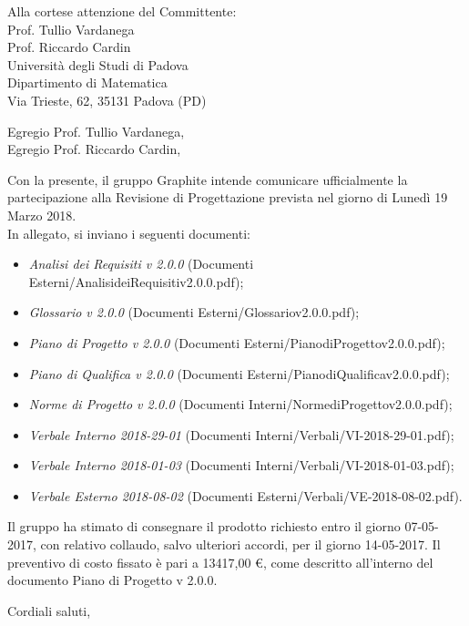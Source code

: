 \documentclass[]{letter}
\begin{document}
\begin{letter}{
		Alla cortese attenzione del Committente: \\
		Prof. Tullio Vardanega \\
		Prof. Riccardo Cardin \\
		Università degli Studi di Padova \\
		Dipartimento di Matematica \\ 
		Via Trieste, 62, 35131 Padova (PD)
	}

\opening{Egregio Prof. Tullio Vardanega, \\ Egregio Prof. Riccardo Cardin,}

\noindent Con la presente, il gruppo Graphite intende comunicare ufficialmente la partecipazione alla Revisione di Progettazione prevista nel giorno di Lunedì 19 Marzo 2018.\\
In allegato, si inviano i seguenti documenti:

\begin{itemize}
	\item \textit{Analisi dei Requisiti v 2.0.0} (Documenti Esterni/AnalisideiRequisitiv2.0.0.pdf);
	\item \textit{Glossario v 2.0.0} (Documenti Esterni/Glossariov2.0.0.pdf);
	\item \textit{Piano di Progetto v 2.0.0} (Documenti Esterni/PianodiProgettov2.0.0.pdf);
	\item \textit{Piano di Qualifica v 2.0.0} (Documenti Esterni/PianodiQualificav2.0.0.pdf);
	\item \textit{Norme di Progetto v 2.0.0} (Documenti Interni/NormediProgettov2.0.0.pdf);
	\item \textit{Verbale Interno 2018-29-01} (Documenti Interni/Verbali/VI-2018-29-01.pdf);
	\item \textit{Verbale Interno 2018-01-03} (Documenti Interni/Verbali/VI-2018-01-03.pdf);
	\item \textit{Verbale Esterno 2018-08-02} (Documenti Esterni/Verbali/VE-2018-08-02.pdf).
\end{itemize}

\noindent Il gruppo ha stimato di consegnare il prodotto richiesto entro il giorno 07-05-2017, con relativo collaudo, salvo ulteriori accordi, per il giorno 14-05-2017. Il preventivo di costo fissato è pari a 13417,00 \euro{}, come descritto all’interno del documento Piano di Progetto v 2.0.0.

\signature{\texttt{[image: firme/SilvestriKevin]} \\ Silvestri Kevin \\Responsabile di Progetto Graphite}

\closing{Cordiali saluti,}




\end{letter}
\end{document}

